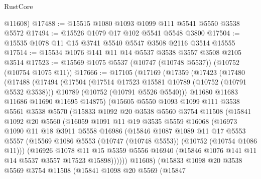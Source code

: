 \begin{lexlean}{RustCore}
\begin{coremodule}
      @11608)
@17488 := @15515 @1080 @1093 @1099 @111 @5541 @5550 @3538 @5572
@17494 := @15526 @1079 @17 @102 @5541 @5548 @3800
@17504 := @15535 @1078 @11 @15 @3741 @5540 @5547 @3508 @2116 @3514 @15555
@17514 := @15534 @1076 @141 @11 @14 @5537 @3538 @3557 @3508 @2105 @3514
@17523 := @15569 @1075 @5537 (@10747 (@10748 @5537)) (@10752 (@10754 @1075 @11))
@17666 := @17105
    (@17169
      (@17359
        (@17423
          (@17480
            (@17488
              (@17494
                (@17504
                  (@17514 @17523 @15581 @10789 (@10752 (@10791 @5532 @3538)))
                  @10789
                  (@10752 (@10791 @5526 @5540)))
                @11680
                @11683
                @11686
                @11690
                @11695
                @14875)
              (@15605
                @5550
                @1093
                @1099
                @111
                @3538
                @5561
                @3538
                @5570
                (@15833
                  @1092
                  @20
                  @3538
                  @5560
                  @3754
                  @11508
                  (@15841
                    @1092
                    @20
                    @5560
                    (@16059
                      @1091
                      @11
                      @19
                      @3535
                      @5559
                      @16068
                      (@16973
                        @1090
                        @11
                        @18
                        @3911
                        @5558
                        @16986
                        (@15846
                          @1087
                          @1089
                          @11
                          @17
                          @5553
                          @5557
                          (@15569 @1086 @5553 (@10747 (@10748 @5553)) (@10752 (@10754 @1086 @11)))
                          (@16926
                            @1078
                            @11
                            @15
                            @5359
                            @5556
                            @16940
                            (@15846 @1076 @141 @11 @14 @5537 @3557 @17523 @15898))))))
                  @11608)
                (@15833
                  @1098
                  @20
                  @3538
                  @5569
                  @3754
                  @11508
                  (@15841
                    @1098
                    @20
                    @5569
                    (@15847

\end{coremodule}
\end{lexlean}
